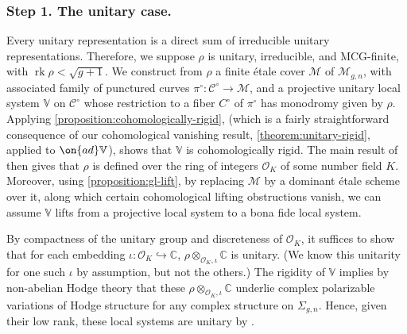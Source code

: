 \documentclass[12 pt]{amsart}
\theoremstyle{plain}
\theoremstyle{definition}
\theoremstyle{remark}
\numberwithin{equation}{section}
\DeclareMathOperator\rk{rk}
\begin{document}
\subsubsection{Step 1. The unitary case.} 
\label{subsubsection:step-1}
Every unitary representation is a direct sum of irreducible unitary representations.
Therefore, we suppose $\rho$ is unitary, irreducible, and MCG-finite, 
with $\rk\rho<\sqrt{g+1}$. We construct from $\rho$ a finite
\'etale cover $\mathscr{M}$ of $\mathscr{M}_{g,n}$, with associated family of
punctured curves $\pi^\circ:\mathscr{C}^\circ\to \mathscr{M}$, and a projective unitary local
system $\mathbb{V}$ on $\mathscr{C}^\circ$ whose restriction to a fiber
$C^\circ$ of
$\pi^\circ$ has monodromy given by $\rho$. 
Applying \autoref{proposition:cohomologically-rigid}, (which is a fairly 
straightforward consequence of our cohomological vanishing result,
\autoref{theorem:unitary-rigid}, applied to $\on{ad}\mathbb{V}$), 
shows that $\mathbb{V}$ is cohomologically rigid. 
The main result of \cite{klevdalP:g-rigid-local-systems-are-integral} then gives that $\rho$ is defined over the ring of integers $\mathscr{O}_K$ of some number field $K$.
Moreover, using \autoref{proposition:gl-lift},
by replacing $\mathscr M$ by a dominant \'etale scheme over it, along which
certain cohomological lifting obstructions vanish, we can assume
$\mathbb V$ lifts from a projective local system to a bona fide local system.

By compactness of the unitary group and discreteness of $\mathscr{O}_K$, it
suffices to show that for each embedding $\iota:
\mathscr{O}_K\hookrightarrow\mathbb{C}$, $\rho\otimes_{\mathscr{O}_K, \iota}
\mathbb{C}$ is unitary. (We know this unitarity for one such $\iota$ by assumption, but not
the others.) The rigidity of $\mathbb{V}$ implies by non-abelian Hodge theory
that these $\rho\otimes_{\mathscr{O}_K, \iota} \mathbb{C}$ underlie complex polarizable variations of Hodge structure for any complex structure on $\Sigma_{g,n}$. 
Hence, given their low rank, these local systems are unitary by \cite[Theorem
1.2.12]{LL:geometric-local-systems}.
\end{document}
